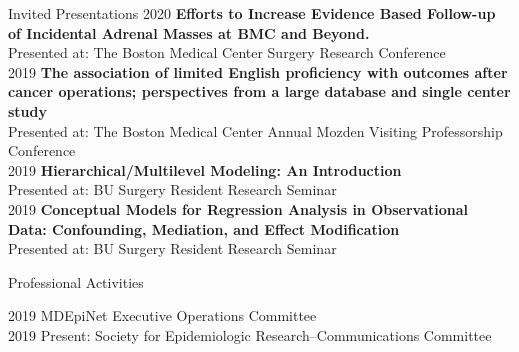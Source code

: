 \documentclass{resume} %
\begin{document}
\pagebreak


\begin{rSection}{Invited Presentations}
   2020 \enspace \textbf{Efforts to Increase Evidence Based Follow-up of Incidental Adrenal Masses at BMC and Beyond.
   }\\
   \hspace*{2mm}Presented at: The Boston Medical Center Surgery Research Conference\\
   2019 \enspace \textbf{The association of limited English proficiency with outcomes after cancer operations; perspectives from a large database and single center study}\\
   \hspace*{2mm}Presented at: The Boston Medical Center Annual Mozden Visiting Professorship Conference\\
   2019 \enspace \textbf{Hierarchical/Multilevel Modeling: An Introduction}\\
   \hspace*{2mm}Presented at: BU Surgery Resident Research Seminar\\
   2019 \enspace \textbf{Conceptual Models for Regression Analysis in Observational Data: Confounding, Mediation, and Effect Modification}\\
   \hspace*{2mm}Presented at: BU Surgery Resident Research Seminar  
   
   \end{rSection}



\begin{rSection}{Professional Activities}
   
   2019 \enspace MDEpiNet Executive Operations Committee\\
   2019 \enspace Present: Society for Epidemiologic Research--Communications Committee
   
   \end{rSection}


\end{document}
